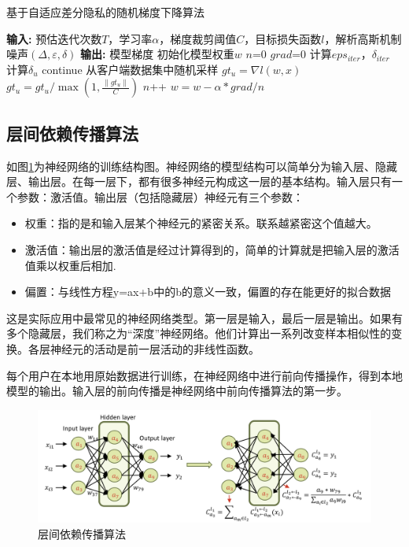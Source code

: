 \newpage

\begin{algorithm}[!htb]
	\caption{基于自适应差分隐私的随机梯度下降算法}
	\label{基于自适应差分隐私的随机梯度下降算法}
	\begin{algorithmic}[1]
		\footnotesize
		\STATE \textbf{输入:} 预估迭代次数$T$，学习率$\alpha$，梯度裁剪阈值$C$，目标损失函数$l$，解析高斯机制噪声$(\Delta, \varepsilon, \delta)$
		\STATE \textbf{输出:} 模型梯度
		\STATE 初始化模型权重$w$
			\STATE $n$=0
			\STATE $grad$=0
			\STATE 计算$eps_{iter}$，$\delta_{iter}$
				\STATE 计算$\delta_{u}$
					\STATE continue
				\ENDIF
				\STATE 从客户端数据集中随机采样
				\STATE $g t_{u}=\nabla l(w, x)$
				\STATE $g t_{u}=g t_{u} / \max \left(1, \frac{\left\|g t_{u}\right\|}{C}\right)$
				\STATE $n$++
			\ENDFOR
			$w=w-\alpha * g r a d / n$
		\ENDWHILE
	\end{algorithmic}
\end{algorithm}

\subsection{层间依赖传播算法}
如图\ref{fig:层间依赖传播算法}为神经网络的训练结构图。神经网络的模型结构可以简单分为输入层、隐藏层、输出层。在每一层下，都有很多神经元构成这一层的基本结构。输入层只有一个参数：激活值。输出层（包括隐藏层）神经元有三个参数：
\begin{itemize}
	\item 权重：指的是和输入层某个神经元的紧密关系。联系越紧密这个值越大。
	\item 激活值：输出层的激活值是经过计算得到的，简单的计算就是把输入层的激活值乘以权重后相加.
	\item 偏置：与线性方程y=ax+b中的b的意义一致，偏置的存在能更好的拟合数据
\end{itemize}

这是实际应用中最常见的神经网络类型。第一层是输入，最后一层是输出。如果有多个隐藏层，我们称之为“深度”神经网络。他们计算出一系列改变样本相似性的变换。各层神经元的活动是前一层活动的非线性函数。

每个用户在本地用原始数据进行训练，在神经网络中进行前向传播操作，得到本地模型的输出。输入层的前向传播是神经网络中前向传播算法的第一步。

\begin{figure}[!hbt]
\centering
	\includegraphics[scale=0.5]{fig2/C3/前向传播算法}%
	\caption{层间依赖传播算法}
	\label{fig:层间依赖传播算法}	
\end{figure}


